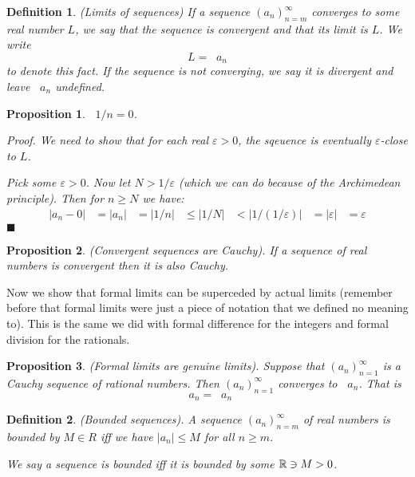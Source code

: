 \documentclass{article}
\newtheorem{definition}{Definition}[subsection]
\newtheorem{proposition}{Proposition}[subsection]
\newcommand{\R}{\mathbb{R}}
\newcommand{\vep}{\varepsilon} %
\newcommand{\leftin}{\mathrel{\reflectbox{$\in$}}}
\DeclareMathOperator{\infLIM}{\mathrm{LIM}_{n \to \infty}}
\DeclareMathOperator{\inflim}{\lim_{n \to \infty}}
\let\it\textit
\begin{document}
\begin{definition}
	(Limits of sequences) If a sequence $(a_n)_{n=m}^\infty$ converges
	to some real number $L$, we say that the sequence
	is convergent and that its limit is $L$. We write
	$$
	L = \inflim a_n
	$$
	to denote this fact. If the sequence is not converging,
	we say it is divergent and leave $\inflim a_n$ undefined.
\end{definition}

\begin{proposition}
	$\inflim 1/n = 0$. 

	\it{Proof}. We need to show that for each real 
	$\vep > 0$, the sqeuence is eventually $\vep$-close 
	to $L$.

	Pick some $\vep > 0$. Now let $N > 1/\vep$ (which 
	we can do because of the Archimedean principle). Then 
	for $n \geq N$ we have:
	\begin{align*}
		|a_n - 0| &= 
		|a_n| &= |1/n| 
		&\leq |1/N| 
		&< |1/(1/\vep)|
		&= |\vep| 
		&= \vep
	\end{align*}
	\hfill $\blacksquare$
\end{proposition}

\begin{proposition}
\label{convergent-implies-cauchy}
	(Convergent sequences are Cauchy). If 
	a sequence of real numbers is convergent
	then it is also Cauchy.
\end{proposition}

Now we show that formal limits can 
be superceded by actual limits (remember
before that formal limits were just 
a piece of notation that we defined no meaning 
to). This is the same we did with formal difference
for the integers and formal division for the rationals.

\begin{proposition}
	(Formal limits are genuine limits). Suppose
	that $(a_n)_{n=1}^\infty$ is a Cauchy
	sequence of rational numbers. Then 
	$(a_n)_{n=1}^\infty$ converges to 
	$\infLIM a_n$. That is
	$$
	\infLIM a_n = \inflim a_n
	$$
\end{proposition}

\begin{definition}
	(Bounded sequences). A sequence 
	$(a_n)_{n=m}^\infty$ of real 
	numbers is bounded by $M \in R$ 
	iff we have $|a_n| \leq M$ for 
	all $n \geq m$. 

	We say a sequence is bounded iff it is bounded
	by some $\R \leftin M > 0$.
\end{definition}
\end{document}
